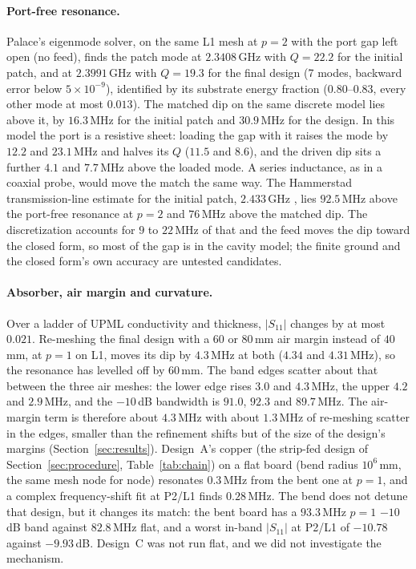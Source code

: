 \documentclass{anvil-paper}
\newcommand{\PL}{P2/L1}
\begin{document}
\paragraph{Port-free resonance.}
Palace's eigenmode solver, on the same L1 mesh at $p = 2$ with the port gap
left open (no feed), finds the patch mode at $2.3408$\,GHz with $Q = 22.2$
for the initial patch, and at $2.3991$\,GHz with $Q = 19.3$ for the final
design (7 modes, backward error below $5\times10^{-9}$), identified by its
substrate energy fraction ($0.80$--$0.83$, every other mode at most
$0.013$). The matched dip on the same discrete model lies above it, by
$16.3$\,MHz for the initial patch and $30.9$\,MHz for the design. In this
model the port is a resistive sheet: loading the gap with it raises the mode
by $12.2$ and $23.1$\,MHz and halves its $Q$ ($11.5$ and $8.6$), and the driven
dip sits a further $4.1$ and $7.7$\,MHz above the loaded mode. A series
inductance, as in a coaxial probe, would move the match the same way.
The Hammerstad transmission-line estimate for the initial patch,
$2.433$\,GHz \citep{hammerstad1975equations}, lies $92.5$\,MHz above the
port-free resonance at $p = 2$ and $76$\,MHz above the matched dip. The
discretization accounts for $9$ to $22$\,MHz of that and the feed moves the
dip toward the closed form, so most of the gap is in the cavity model; the
finite ground and the closed form's own accuracy are untested candidates.

\paragraph{Absorber, air margin and curvature.}
Over a ladder of UPML conductivity and thickness, $|S_{11}|$ changes by at
most $0.021$. Re-meshing the final design with a $60$ or $80$\,mm air margin
instead of $40$\,mm, at $p = 1$ on L1, moves its dip by $4.3$\,MHz at both
($4.34$ and $4.31$\,MHz), so the resonance has levelled off by $60$\,mm. The
band edges scatter about that between the three air meshes: the lower edge
rises $3.0$ and $4.3$\,MHz, the upper $4.2$ and $2.9$\,MHz, and the $-10$\,dB
bandwidth is $91.0$, $92.3$ and $89.7$\,MHz. The air-margin term is therefore
about $4.3$\,MHz with about $1.3$\,MHz of re-meshing scatter in the edges,
smaller than the refinement shifts but of the size of the design's margins
(Section~\ref{sec:results}).
Design~A's copper (the strip-fed design of Section~\ref{sec:procedure}, Table~\ref{tab:chain}) on
a flat board (bend radius $10^6$\,mm, the same mesh node for node)
resonates $0.3$\,MHz from the bent one at $p = 1$, and a complex
frequency-shift fit at \PL{} finds $0.28$\,MHz. The bend does not detune
that design, but it changes its match: the bent board has a $93.3$\,MHz
$p = 1$ $-10$\,dB band against $82.8$\,MHz flat, and a worst in-band
$|S_{11}|$ at \PL{} of $-10.78$ against $-9.93$\,dB. Design~C was not run
flat, and we did not investigate the mechanism.
\end{document}
